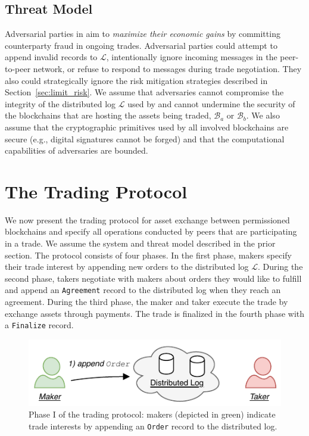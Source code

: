 \subsection{Threat Model}
Adversarial parties in \ModelName{} aim to \emph{maximize their economic gains} by committing counterparty fraud in ongoing trades.
Adversarial parties could attempt to append invalid records to $ \mathcal{L} $, intentionally ignore incoming messages in the peer-to-peer network, or refuse to respond to messages during trade negotiation.
They also could strategically ignore the risk mitigation strategies described in Section~\ref{sec:limit_risk}.
We assume that adversaries cannot compromise the integrity of the distributed log $ \mathcal{L} $ used by \ModelName{} and cannot undermine the security of the blockchains that are hosting the assets being traded, $ \mathcal{B}_a $ or $ \mathcal{B}_b $.
We also assume that the cryptographic primitives used by all involved blockchains are secure (e.g., digital signatures cannot be forged) and that the computational capabilities of adversaries are bounded.

\section{The \ModelName{} Trading Protocol} \label{sec:protocol}
We now present the \ModelName{} trading protocol for asset exchange between permissioned blockchains and specify all operations conducted by peers that are participating in a trade.
We assume the system and threat model described in the prior section.
The protocol consists of four phases.
In the first phase, makers specify their trade interest by appending new orders to the distributed log $ \mathcal{L} $.
During the second phase, takers negotiate with makers about orders they would like to fulfill and append an \texttt{Agreement} record to the distributed log when they reach an agreement.
During the third phase, the maker and taker execute the trade by exchange assets through payments.
The trade is finalized in the fourth phase with a \texttt{Finalize} record.

\begin{figure}[h]
	\centering
	\includegraphics[width=0.7\linewidth]{xchange/assets/xchange_protocol_1}
	\caption{Phase I of the \ModelName{} trading protocol: makers (depicted in green) indicate trade interests by appending an \texttt{Order} record to the distributed log.}
	\label{fig:matching_protocol_1}
\end{figure}

